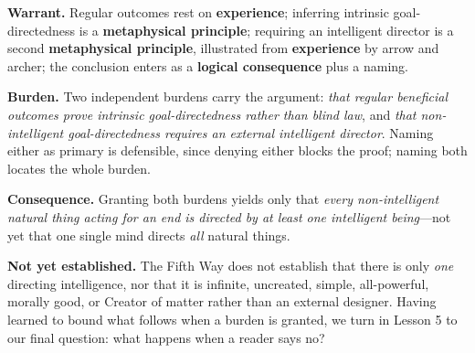 \textbf{Warrant.} Regular outcomes rest on \textbf{experience}; inferring intrinsic goal-directedness is a \textbf{metaphysical principle}; requiring an intelligent director is a second \textbf{metaphysical principle}, illustrated from \textbf{experience} by arrow and archer; the conclusion enters as a \textbf{logical consequence} plus a naming.

\textbf{Burden.} Two independent burdens carry the argument: \emph{that regular beneficial outcomes prove intrinsic goal-directedness rather than blind law}, and \emph{that non-intelligent goal-directedness requires an external intelligent director}. Naming either as primary is defensible, since denying either blocks the proof; naming both locates the whole burden.

\textbf{Consequence.} Granting both burdens yields only that \emph{every non-intelligent natural thing acting for an end is directed by at least one intelligent being}---not yet that one single mind directs \emph{all} natural things.

\textbf{Not yet established.} The Fifth Way does not establish that there is only \emph{one} directing intelligence, nor that it is infinite, uncreated, simple, all-powerful, morally good, or Creator of matter rather than an external designer. Having learned to bound what follows when a burden is granted, we turn in Lesson 5 to our final question: what happens when a reader says no?
